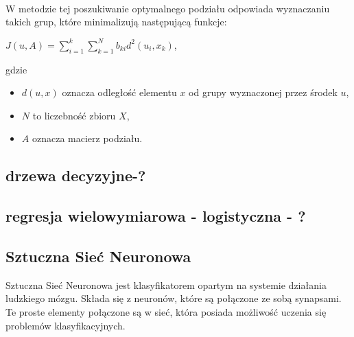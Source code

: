\documentclass[12pt,a4paper]{report}
\begin{document}
\\W metodzie tej poszukiwanie optymalnego podziału odpowiada wyznaczaniu takich grup, które minimalizują następującą funkcje:
\begin{center}
$J(u,A) = \sum_{i=1}^k \sum_{k=1}^N b_{ki}d^2(u_i,x_k)$,
\end{center}
gdzie 
\begin{itemize}
\item $d(u,x)$ oznacza odległość elementu $x$ od grupy wyznaczonej przez środek $u$,
\item $N$ to liczebność zbioru $X$,
\item $A$ oznacza macierz podziału.
\end{itemize}
 
\subsection{drzewa decyzyjne-?}
\subsection{regresja wielowymiarowa - logistyczna - ?}
\subsection{Sztuczna Sieć Neuronowa}
Sztuczna Sieć Neuronowa jest klasyfikatorem opartym na systemie działania ludzkiego mózgu. Składa się z neuronów, które są połączone ze sobą synapsami. Te proste elementy połączone są w sieć, która posiada możliwość uczenia się problemów klasyfikacyjnych.
\\
\end{document}
